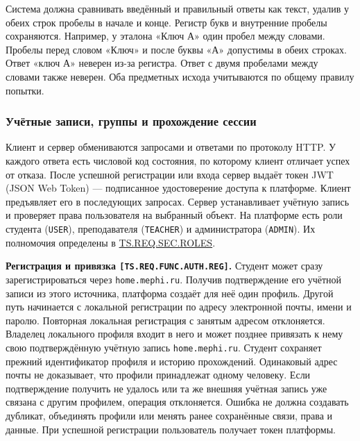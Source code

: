 \documentclass[12pt,a4paper]{article}
\begin{document}
Система должна сравнивать введённый и правильный ответы как текст, удалив у обеих строк пробелы в начале и конце. Регистр букв и внутренние пробелы сохраняются. Например, у эталона «Ключ А» один пробел между словами. Пробелы перед словом «Ключ» и после буквы «А» допустимы в обеих строках. Ответ «ключ А» неверен из-за регистра. Ответ с двумя пробелами между словами также неверен. Оба предметных исхода учитываются по общему правилу попытки.

\subsubsection{Учётные записи, группы и прохождение сессии}\label{ux443ux447ux451ux442ux43dux44bux435-ux437ux430ux43fux438ux441ux438-ux433ux440ux443ux43fux43fux44b-ux438-ux43fux440ux43eux445ux43eux436ux434ux435ux43dux438ux435-ux441ux435ux441ux441ux438ux438}

\hypertarget{учётные-записи-группы-и-прохождение-сессии}{}

Клиент и сервер обмениваются запросами и ответами по протоколу HTTP. У каждого ответа есть числовой код состояния, по которому клиент отличает успех от отказа. После успешной регистрации или входа сервер выдаёт токен JWT (JSON Web Token) --- подписанное удостоверение доступа к платформе. Клиент предъявляет его в последующих запросах. Сервер устанавливает учётную запись и проверяет права пользователя на выбранный объект. На платформе есть роли студента (\texttt{USER}), преподавателя (\texttt{TEACHER}) и администратора (\texttt{ADMIN}). Их полномочия определены в {\hyperlink{ts-req-sec-roles}{TS.REQ.SEC.ROLES}}.

\hypertarget{ts-req-func-auth-reg}{} \textbf{Регистрация и привязка \texttt{[TS.\allowbreak{}REQ.\allowbreak{}FUNC.\allowbreak{}AUTH.\allowbreak{}REG]}.} Студент может сразу зарегистрироваться через \texttt{home.\allowbreak{}mephi.\allowbreak{}ru}. Получив подтверждение его учётной записи из этого источника, платформа создаёт для неё один профиль. Другой путь начинается с локальной регистрации по адресу электронной почты, имени и паролю. Повторная локальная регистрация с занятым адресом отклоняется. Владелец локального профиля входит в него и может позднее привязать к нему свою подтверждённую учётную запись \texttt{home.\allowbreak{}mephi.\allowbreak{}ru}. Студент сохраняет прежний идентификатор профиля и историю прохождений. Одинаковый адрес почты не доказывает, что профили принадлежат одному человеку. Если подтверждение получить не удалось или та же внешняя учётная запись уже связана с другим профилем, операция отклоняется. Ошибка не должна создавать дубликат, объединять профили или менять ранее сохранённые связи, права и данные. При успешной регистрации пользователь получает токен платформы.
\end{document}
